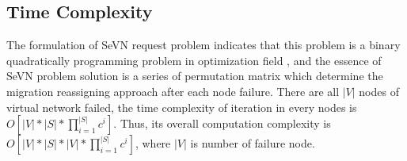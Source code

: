 
\subsection{Time Complexity}
The formulation of SeVN request problem indicates that this problem is a binary quadratically programming problem in optimization field , and the essence of SeVN problem solution is a series of permutation matrix  which determine the migration reassigning approach after each node failure. There are all $|V|$ nodes of virtual network failed, the time complexity of iteration in every nodes is $O[|V|*|S|*\prod_{i=1}^{|S|}c^i]$. Thus, its overall computation complexity is $O[|V|*|S|*|V|*\prod_{i=1}^{|S|}c^i]$, where $|V|$ is number of failure node.
